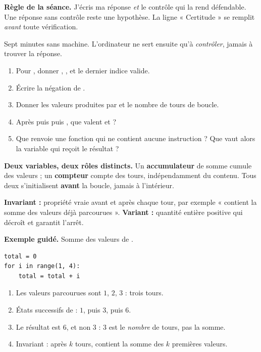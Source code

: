 \documentclass[10pt,a4paper]{article}
\begin{document}
\begin{graybox}\small\textbf{Règle de la séance.} J'écris ma réponse \emph{et} le contrôle qui la rend défendable. Une réponse sans contrôle reste une hypothèse. La ligne « Certitude » se remplit \emph{avant} toute vérification.\end{graybox}
\par\vspace{2mm}
Sept minutes sans machine. L'ordinateur ne sert ensuite qu'à \emph{contrôler}, jamais à trouver la réponse.
\begin{enumerate}
\item Pour , donner , ,  et le dernier indice valide.
\item Écrire la négation de .
\item Donner les valeurs produites par  et le nombre de tours de boucle.
\item Après  puis  puis , que valent  et  ?
\item Que renvoie une fonction qui ne contient aucune instruction  ? Que vaut alors la variable qui reçoit le résultat ?
\end{enumerate}
\certline
\aideline
\needspace{62mm}\par\vspace{3mm}
\begin{methodbox}
\textbf{Deux variables, deux rôles distincts.} Un \textbf{accumulateur} de somme cumule des valeurs ;
un \textbf{compteur} compte des tours, indépendamment du contenu. Tous deux s'initialisent
\textbf{avant} la boucle, jamais à l'intérieur.
\par\smallskip
\textbf{Invariant :} propriété vraie avant et après chaque tour, par exemple «  contient la somme
des valeurs déjà parcourues ». \textbf{Variant :} quantité entière positive qui décroît et garantit l'arrêt.
\end{methodbox}
\begin{graybox}
\textbf{Exemple guidé.} Somme des valeurs de .
\begin{lstlisting}
total = 0
for i in range(1, 4):
    total = total + i
\end{lstlisting}
\begin{enumerate}
\item Les valeurs parcourues sont $1$, $2$, $3$ : trois tours.
\item États successifs de  : $1$, puis $3$, puis $6$.
\item Le résultat est $6$, et non $3$ : $3$ est le \emph{nombre} de tours, pas la somme.
\item Invariant : après $k$ tours,  contient la somme des $k$ premières valeurs.
\end{enumerate}
\end{graybox}
\end{document}
